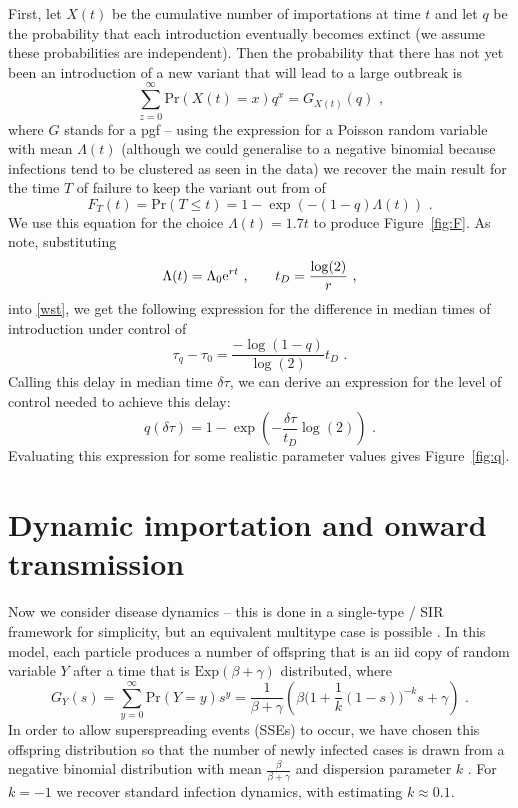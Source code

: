\documentclass[10pt,a4paper]{article}
\newcommand{\be}{\begin{equation}}
\newcommand{\ee}{\end{equation}}
\begin{document}
First, let $X(t)$ be the cumulative number of importations at time $t$ and let
$q$ be the probability that each introduction eventually becomes extinct (we
assume these probabilities are independent). Then the probability that there
has not yet been an introduction of a new variant that will lead to a large
outbreak is
\be
\sum_{z=0}^{\infty} \mathrm{Pr}(X(t) = x) q^x = G_{X(t)}(q) \text{ ,}
\ee
where $G$ stands for a pgf -- using the expression for a Poisson random
variable with mean $\Lambda(t)$ (although we could generalise to a negative
binomial because infections tend to be clustered as seen in the data) we recover the main
result for the time $T$ of failure to keep the variant out
from \citeauthor{ScaliaTomba:2008} of
\be
F_T(t) = \mathrm{Pr}(T \leq t) = 1 - \exp(-(1-q)\Lambda(t)) \text{ .}
\label{wst}
\ee
We use this equation for the choice $\Lambda(t) = 1.7 t$ to produce
Figure~\ref{fig:F}.  As \citeauthor{ScaliaTomba:2008} note, substituting
\be
\Lambda(t) = \Lambda_0 {\rm e}^{rt}
\text{ ,} \qquad
t_D = \frac{\log(2)}{r} \text{ ,}
\ee
into \eqref{wst}, we get the following expression for the difference in median
times of introduction under control of
\be
\tau_q - \tau_0 = \frac{-\log(1-q)}{\log(2)} t_D \text{ .}
\ee
Calling this delay in median time $\delta \tau$, we can derive an expression for
the level of control needed to achieve this delay:
\be
q(\delta \tau) = 1- \exp\left( - \frac{\delta \tau}{t_D} \log(2)\right) \text{ .}
\ee
Evaluating this expression for some realistic parameter values gives
Figure~\ref{fig:q}.

\section{Dynamic importation and onward transmission}

Now we consider disease dynamics -- this is done in a single-type / SIR
framework for simplicity, but an equivalent multitype case is possible
\citep{Dorman:2004}. In this model, each particle produces a number of
offspring that is an iid copy of random variable $Y$ after a time that is
$\mathrm{Exp}(\beta + \gamma)$ distributed, where
\be
G_{Y}(s)= \sum_{y=0}^{\infty} \mathrm{Pr}(Y = y) s^y = 
\frac{1}{\beta + \gamma} \left(\beta\big(1+\frac{1}{k}(1-s)\big)^{-k}s + \gamma\right)
 \text{ .} \label{SSEp}
\ee
In order to allow superspreading events (SSEs) to occur, we have chosen this
offspring distribution so that the number of newly infected cases is drawn from
a negative binomial distribution with mean $\frac{\beta}{\beta+\gamma}$ and
dispersion parameter $k$ \citep{Lloyd-Smith:2005}. For $k=-1$ we recover
standard infection dynamics, with \citet{Endo:2020} estimating $k\approx 0.1$.
\end{document}
